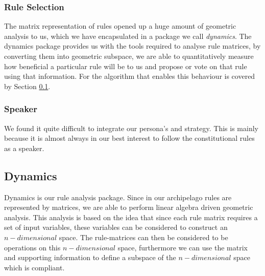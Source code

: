\subsubsection*{Rule Selection}
The matrix representation of rules opened up a huge amount of geometric analysis to us, which we have encapsulated in a package we call \emph{dynamics}. The dynamics package provides us with the tools required to analyse rule matrices, by converting them into geometric subspace, we are able to quantitatively measure how beneficial a particular rule will be to us and propose or vote on that rule using that information. For the algorithm that enables this behaviour is covered by Section \ref{dynamics}.


\subsubsection{Speaker}
We found it quite difficult to integrate our persona's and strategy. This is mainly because it is almost always in our best interest to follow the constitutional rules as a speaker.\\

\subsection{Dynamics}
\label{dynamics}
Dynamics is our rule analysis package. Since in our archipelago rules are represented by matrices, we are able to perform linear algebra driven geometric analysis. This analysis is based on the idea that since each rule matrix requires a set of input variables, these variables can be considered to construct an $n-dimensional$ space. The rule-matrices can then be considered to be operations on this $n-dimensional$ space, furthermore we can use the matrix and supporting information to define a subspace of the $n-dimensional$ space which is compliant. \\

